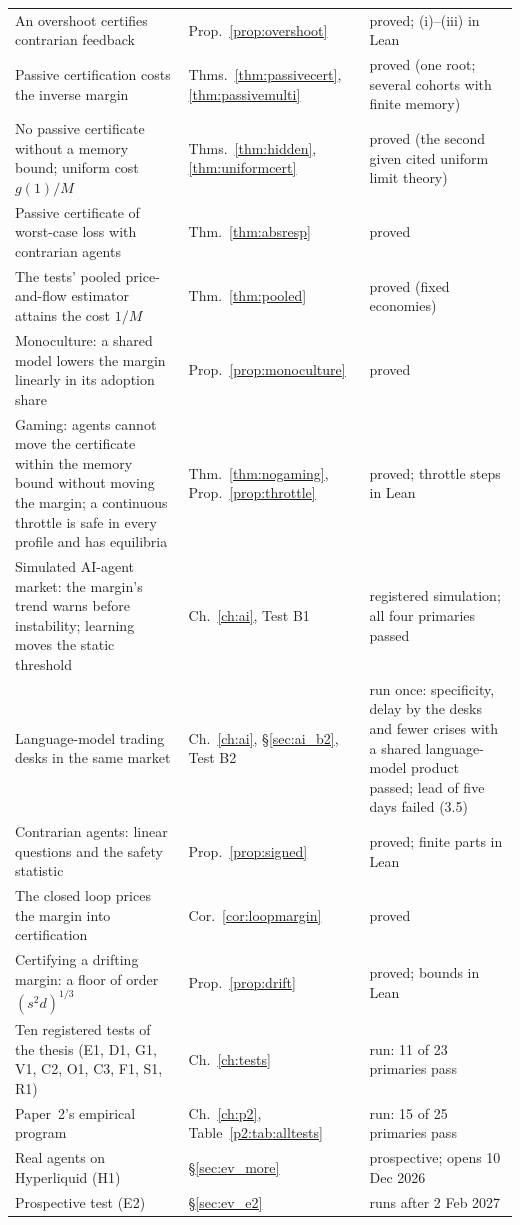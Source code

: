 {\begin{longtable}{p{}p{}p{}}
An overshoot certifies contrarian feedback & Prop.~\ref{prop:overshoot} & proved; (i)--(iii) in Lean\\
Passive certification costs the inverse margin & Thms.~\ref{thm:passivecert}, \ref{thm:passivemulti} & proved (one root; several cohorts with finite memory)\\
No passive certificate without a memory bound; uniform cost $g(1)/M$ & Thms.~\ref{thm:hidden}, \ref{thm:uniformcert} & proved (the second given cited uniform limit theory)\\
Passive certificate of worst-case loss with contrarian agents & Thm.~\ref{thm:absresp} & proved\\
The tests' pooled price-and-flow estimator attains the cost $1/M$ & Thm.~\ref{thm:pooled} & proved (fixed economies)\\
Monoculture: a shared model lowers the margin linearly in its adoption share & Prop.~\ref{prop:monoculture} & proved\\
Gaming: agents cannot move the certificate within the memory bound without moving the margin; a continuous throttle is safe in every profile and has equilibria & Thm.~\ref{thm:nogaming}, Prop.~\ref{prop:throttle} & proved; throttle steps in Lean\\
Simulated AI-agent market: the margin's trend warns before instability; learning moves the static threshold & Ch.~\ref{ch:ai}, Test B1 & registered simulation; all four primaries passed\\
Language-model trading desks in the same market & Ch.~\ref{ch:ai}, \S\ref{sec:ai_b2}, Test B2 & run once: specificity, delay by the desks and fewer crises with a shared language-model product passed; lead of five days failed (3.5)\\
Contrarian agents: linear questions and the safety statistic & Prop.~\ref{prop:signed} & proved; finite parts in Lean\\
The closed loop prices the margin into certification & Cor.~\ref{cor:loopmargin} & proved\\
Certifying a drifting margin: a floor of order $(s^2d)^{1/3}$ & Prop.~\ref{prop:drift} & proved; bounds in Lean\\
Ten registered tests of the thesis (E1, D1, G1, V1, C2, O1, C3, F1, S1, R1) & Ch.~\ref{ch:tests} & run: 11 of 23 primaries pass\\
Paper~2's empirical program & Ch.~\ref{ch:p2}, Table~\ref{p2:tab:alltests} & run: 15 of 25 primaries pass\\
Real agents on Hyperliquid (H1) & \S\ref{sec:ev_more} & prospective; opens 10 Dec 2026\\
Prospective test (E2) & \S\ref{sec:ev_e2} & runs after 2 Feb 2027\\
\bottomrule
\end{longtable}}

